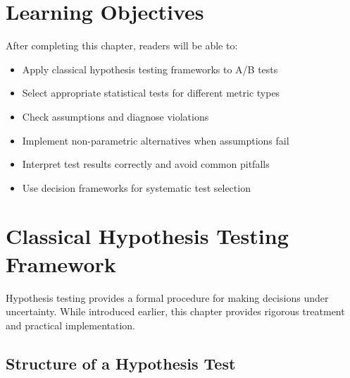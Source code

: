 \section{Learning Objectives}

After completing this chapter, readers will be able to:
\begin{itemize}
    \item Apply classical hypothesis testing frameworks to A/B tests
    \item Select appropriate statistical tests for different metric types
    \item Check assumptions and diagnose violations
    \item Implement non-parametric alternatives when assumptions fail
    \item Interpret test results correctly and avoid common pitfalls
    \item Use decision frameworks for systematic test selection
\end{itemize}

\section{Classical Hypothesis Testing Framework}

Hypothesis testing provides a formal procedure for making decisions under uncertainty. While introduced earlier, this chapter provides rigorous treatment and practical implementation.

\subsection{Structure of a Hypothesis Test}

